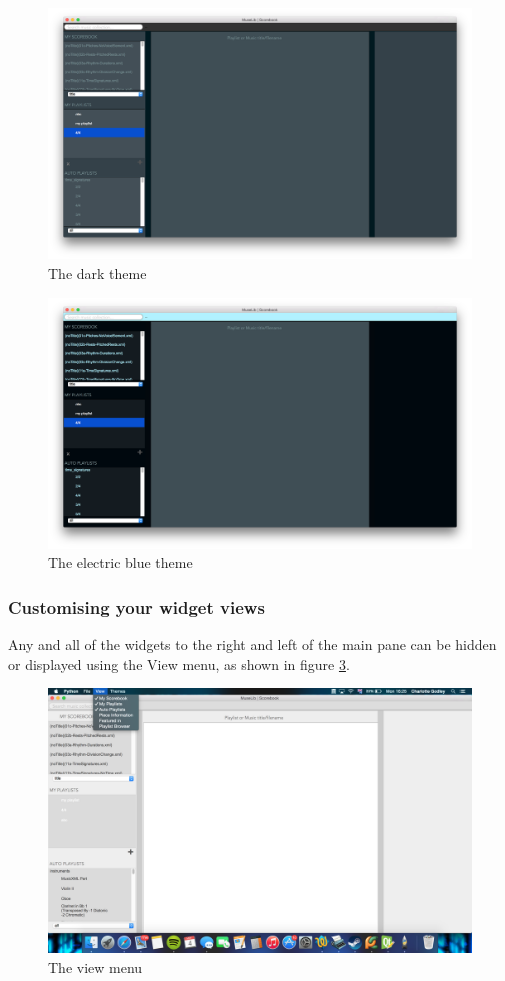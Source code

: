 \begin{figure}[H]
\centering
\includegraphics[width=400pt]{main_dark}
\caption{The dark theme}
\label{fig:theme2}	
\end{figure}

\begin{figure}[H]
\centering
\includegraphics[width=400pt]{main_electric}
\caption{The electric blue theme}
\label{fig:theme2}	
\end{figure}

\subsubsection{Customising your widget views}
Any and all of the widgets to the right and left of the main pane can be hidden or displayed using the View menu, as shown in figure \ref{fig:view}.

\begin{figure}[H]
\centering
\includegraphics[width=500pt]{view}
\caption{The view menu}
\label{fig:view}	
\end{figure}


